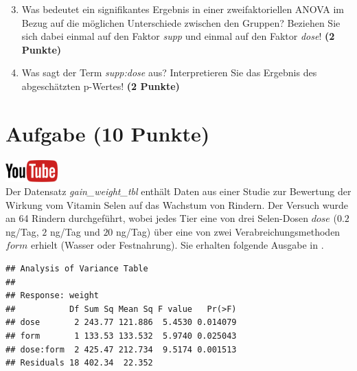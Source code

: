 \documentclass[a4paper, 9pt]{scrartcl}\usepackage[]{graphicx}\usepackage[]{xcolor}
\makeatletter
\newenvironment{kframe}{%
 \def\at@end@of@kframe{}%
 \ifinner\ifhmode%
  \def\at@end@of@kframe{\end{minipage}}%
  \begin{minipage}{\columnwidth}%
 \fi\fi%
 \def\FrameCommand##1{\hskip\@totalleftmargin \hskip-\fboxsep
 \colorbox{shadecolor}{##1}\hskip-\fboxsep
     \hskip-\linewidth \hskip-\@totalleftmargin \hskip\columnwidth}%
 \MakeFramed {\advance\hsize-\width
   \@totalleftmargin\z@ \linewidth\hsize
   \@setminipage}}%
 {\par\unskip\endMakeFramed%
 \at@end@of@kframe}
\newenvironment{knitrout}{}{} %
\makeatother
\begin{document}
\vspace{1Ex}

\begin{enumerate}
  \setcounter{enumi}{2}
\item Was bedeutet ein signifikantes Ergebnis in einer zweifaktoriellen
  ANOVA im Bezug auf die m{\"o}glichen Unterschiede zwischen den Gruppen?
  Beziehen Sie sich dabei einmal auf den Faktor \textit{supp} und einmal
  auf den Faktor \textit{dose}! \textbf{(2 Punkte)}
\item Was sagt der Term \textit{supp:dose} aus? Interpretieren Sie das
  Ergebnis des abgesch{\"a}tzten p-Wertes! \textbf{(2 Punkte)}
\end{enumerate}
 
\clearpage

\section{Aufgabe \hfill (10 Punkte)}

\hfill\href{https://youtu.be/rWTyHXXlYjY}{\includegraphics[width =
  2cm]{img/youtube}}\\[1Ex]



Der Datensatz \textit{gain\_weight\_tbl} enth{\"a}lt Daten aus einer Studie zur Bewertung
der Wirkung vom Vitamin Selen auf das Wachstum von Rindern. Der
Versuch wurde an 64 Rindern durchgef{\"u}hrt, wobei
jedes Tier eine von drei Selen-Dosen $dose$ ($0.2$ ng/Tag, $2$ ng/Tag und $20$ ng/Tag)
{\"u}ber eine von zwei Verabreichungsmethoden $form$ erhielt (Wasser oder
Festnahrung). Sie erhalten folgende Ausgabe in \Rlogo.

\begin{knitrout}
\color{fgcolor}\begin{kframe}
\begin{verbatim}
## Analysis of Variance Table
## 
## Response: weight
##           Df Sum Sq Mean Sq F value   Pr(>F)
## dose       2 243.77 121.886  5.4530 0.014079
## form       1 133.53 133.532  5.9740 0.025043
## dose:form  2 425.47 212.734  9.5174 0.001513
## Residuals 18 402.34  22.352
\end{verbatim}
\end{kframe}
\end{knitrout}
\end{document}
